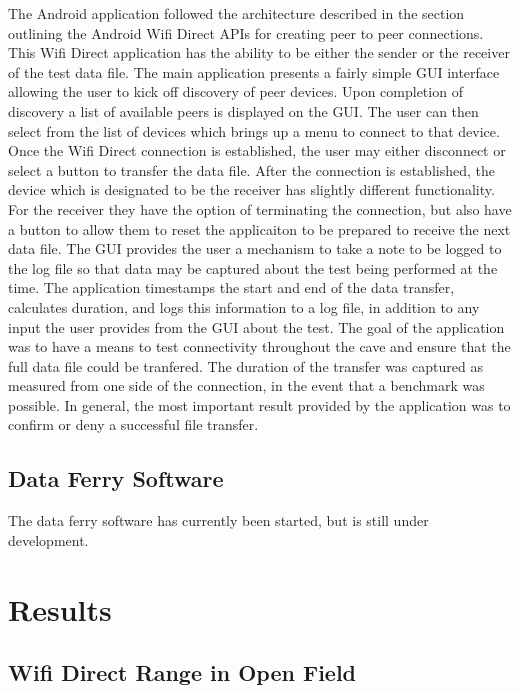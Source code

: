 \documentclass[10pt,twocolumn]{article}
\begin{document}
The Android application followed the architecture described in the section outlining the Android Wifi Direct APIs for creating peer to peer connections. 
This Wifi Direct application has the ability to be either the sender or the receiver of the test data file.
The main application presents a fairly simple GUI interface allowing the user to kick off discovery of peer devices. 
Upon completion of discovery a list of available peers is displayed on the GUI.
The user can then select from the list of devices which brings up a menu to connect to that device.
Once the Wifi Direct connection is established, the user may either disconnect or select a button to transfer the data file.
After the connection is established, the device which is designated to be the receiver has slightly different functionality.
For the receiver they have the option of terminating the connection, but also have a button to allow them to reset the applicaiton to be prepared to receive the next data file.
The GUI provides the user a mechanism to take a note to be logged to the log file so that data may be captured about the test being performed at the time.
The application timestamps the start and end of the data transfer, calculates duration, and logs this information to a log file, in addition to any input the user provides from the GUI about the test.
The goal of the application was to have a means to test connectivity throughout the cave and ensure that the full data file could be tranfered.
The duration of the transfer was captured as measured from one side of the connection, in the event that a benchmark was possible.
In general, the most important result provided by the application was to confirm or deny a successful file transfer.

\subsection{Data Ferry Software}
The data ferry software has currently been started, but is still under development.

\section{Results}

\subsection{Wifi Direct Range in Open Field}
\end{document}
